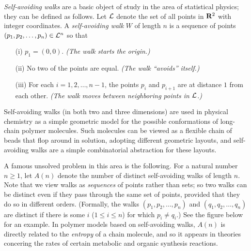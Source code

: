 \documentclass[12pt]{article}
\def\L{{\cal L}}
\def\L{{\cal L}}
\begin{document}
\begin{enumerate}
{\em Self-avoiding walks} are a basic object of study
in the area of statistical physics; they can be defined as follows.
Let $\L$ denote the set of all points in ${\bf R}^2$
with integer coordinates.
A {\em self-avoiding walk} $W$ of length $n$ is
a sequence of points $(p_1, p_2, \ldots, p_n) \in \L^n$
so that
\begin{itemize}
\item[(i)] $p_1 = (0,0)$.  {\em (The walk starts the origin.)}
\item[(ii)] No two of the points are equal.
{\em (The walk ``avoids'' itself.)}
\item[(iii)] For each $i = 1, 2, \ldots, n-1$,
the points $p_i$ and $p_{i+1}$ are at distance $1$ from each other.
{\em (The walk moves between neighboring points in $\L$.)}
\end{itemize}
Self-avoiding walks (in both two and three dimensions)
are used in physical chemistry as a simple geometric model
for the possible conformations of long-chain polymer molecules.
Such molecules can be viewed as a flexible chain of beads
that flop around in solution, adopting different geometric layouts,
and self-avoiding walks are a simple combinatorial abstraction
for these layouts.

A famous unsolved problem in this area is the following.
For a natural number $n \geq 1$, let $A(n)$ denote the number of
distinct self-avoiding walks of length $n$.
Note that we view walks as {\em sequences} of points
rather than sets; so two walks can be distinct even if they
pass through the same set of points, provided that
they do so in different orders.
(Formally, the walks $(p_1, p_2, \ldots, p_n)$
and $(q_1, q_2, \ldots, q_n)$ are distinct if there is some
$i$ ($1 \leq i \leq n$) for which $p_i \neq q_i$.)
See the figure below for an example.
In polymer models based on self-avoiding walks,
$A(n)$ is directly related to the {\em entropy} of
a chain molecule, and so it appears in theories concering
the rates of certain metabolic and organic synthesis reactions.

\begin{figure}[h]
\begin{center}



\end{center}
\end{figure}
\end{enumerate}
\end{document}
